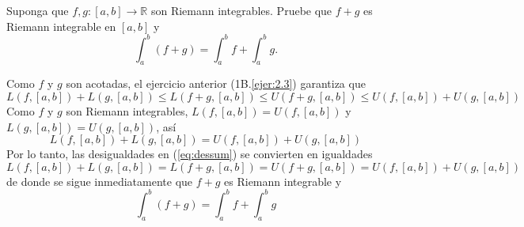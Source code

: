
\setcounter{eje}{3} %
\begin{ejer}
Suponga que $f, g\colon [a, b] \to \mathbb{R}$ son Riemann integrables. Pruebe que $f + g$ es Riemann integrable en $[a, b]$ y
$$
\int_a^b (f + g) = \int_a^b f + \int_a^b g.
$$
\end{ejer}
\begin{sol}
Como $f$ y $g$ son acotadas, el ejercicio anterior (1B.\ref{ejer:2.3}) garantiza que 
\begin{equation}\label{eq:dessum}
L(f, [a, b]) + L(g, [a, b]) 
\leq L(f + g, [a, b])
\leq U(f + g, [a, b]) 
\leq U(f, [a, b]) + U(g, [a, b])
\end{equation}
Como $f$ y $g$ son Riemann integrables, $L(f, [a, b]) = U(f, [a, b])$ y $L(g, [a, b]) = U(g, [a, b])$, así
\[
L(f, [a, b]) + L(g, [a, b]) = U(f, [a, b]) + U(g, [a, b])
\]
Por lo tanto, las desigualdades en (\ref{eq:dessum}) se convierten en igualdades
\[
L(f, [a, b]) + L(g, [a, b]) 
= L(f + g, [a, b])
= U(f + g, [a, b]) 
= U(f, [a, b]) + U(g, [a, b])
\]
de donde se sigue inmediatamente que $f+g$ es Riemann integrable y 
\[
\int^b_a (f+g) = \int^b_a f + \int^b_a g
\]
\end{sol}


